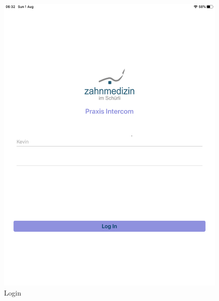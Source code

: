 \begin{figure}[h]
    \centering
    \begin{minipage}[b]{0.4\textwidth}
        \includegraphics[width=\textwidth]{graphics/screenshot-login}
        \caption{Login}
    \end{minipage}
    \hfill
    \begin{minipage}[b]{0.4\textwidth}

\end{minipage}
\end{figure}
